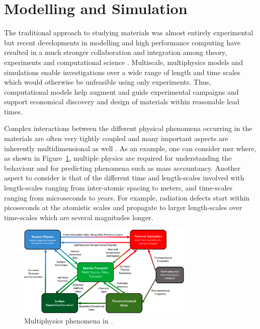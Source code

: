 \section{Modelling and Simulation}
	The traditional approach to studying materials was almost entirely experimental but recent developments in modelling and high performance computing have resulted in a much stronger collaboration and integration among theory, experiments and computational science \cite{STAN200920}. Multiscale, multiphysics models and simulations enable investigations over a wide range of length and time scales which would otherwise be unfeasible using only experiments. Thus, computational models help augment and guide experimental campaigns and support economical discovery and design of materials within reasonable lead times.

	Complex interactions between the different physical phenomena occurring in the materials are often very tightly coupled and many important aspects are inherently multidimensional  as well \cite{WILLIAMSON2012149}. As an example, one can consider \gls{msr} where, as shown in Figure~\ref{fig:msr_mf}, multiple physics  are required for understanding the behaviour and for predicting phenomena such as mass accountancy. Another aspect to consider is that of the different time and length-scales involved with length-scales ranging from inter-atomic spacing to meters, and time-scales ranging from microseconds to years. For example, radiation defects start within picoseconds at the atomistic scales and propagate to larger length-scales over time-scales which are several magnitudes longer.
	\begin{figure}[htb]
		\centering
		\includegraphics[width=0.75\textwidth]{figures/chapter-1/MSR_MP}
		\caption[Multiphysics phenomena in .]{Multiphysics phenomena in  \cite{McMurray:2021aa}.}
		\label{fig:msr_mf}
	\end{figure}
	
